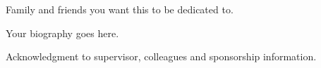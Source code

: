 \begin{abstract}
Your abstract description goes here.
\end{abstract}


\makecopyrightpage
\maketitlepage


\begin{dedication}
Family and friends you want this to be dedicated to.
\end{dedication}


\begin{biography}
Your biography goes here.
\end{biography}


\begin{acknowledgements}
Acknowledgment to supervisor, colleagues and sponsorship information.
\end{acknowledgements}


\thesistableofcontents
\thesislistoftables
\thesislistoffigures


\makeauthorshipstatementpage